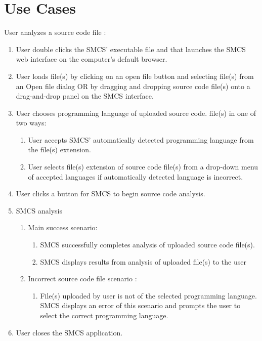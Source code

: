 \documentclass{scrreprt}
\begin{document}
	\section{Use Cases}
	User analyzes a source code file :
	\begin{enumerate}
		\item User double clicks the SMCS’ executable file and that launches the SMCS web interface on the computer’s default browser.
		\item User loads file(s) by clicking on an open file button and selecting file(s) from an Open file dialog OR by dragging and dropping source code file(s) onto a drag-and-drop panel on the SMCS interface.
		\item User chooses programming language of uploaded source code. file(s) in one of two ways:
		\begin{enumerate}
			\item User accepts SMCS’ automatically detected programming language from the file(s) extension.
			\item User selects file(s) extension of source code file(s) from a drop-down menu of accepted languages if automatically detected language is incorrect.
		\end{enumerate}
		\item User clicks a button for SMCS to begin source code analysis.
		\item SMCS analysis
		\begin{enumerate}
			\item Main success scenario:
			\begin{enumerate}
				\item SMCS successfully completes analysis of uploaded source code file(s).
				\item SMCS displays results from analysis of uploaded file(s) to the user
			\end{enumerate}
			\item Incorrect source code file scenario :
			\begin{enumerate}
				\item File(s) uploaded by user is not of the selected programming language. SMCS displays an error of this scenario and prompts the user to select the correct programming language.
			\end{enumerate}
		\end{enumerate}
		\item User closes the SMCS application.
	\end{enumerate}
\end{document}
